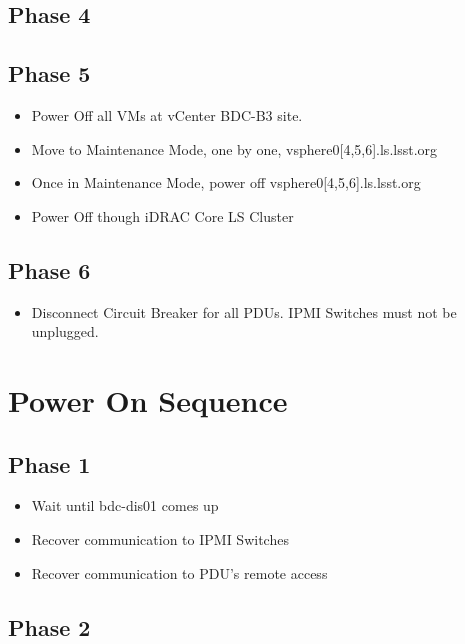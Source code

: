 \newpage
\subsection{Phase 4}

\newpage
\subsection{Phase 5}
\begin{itemize}
  \item Power Off all VMs at vCenter BDC-B3 site.
  \item Move to Maintenance Mode, one by one, vsphere0[4,5,6].ls.lsst.org
  \item Once in Maintenance Mode, power off vsphere0[4,5,6].ls.lsst.org
  \item Power Off though iDRAC Core LS Cluster
\end{itemize}

\newpage
\subsection{Phase 6}
\begin{itemize}
  \item Disconnect Circuit Breaker for all PDUs. IPMI Switches must not be unplugged.
\end{itemize}

\newpage
\section{Power On Sequence}
\subsection{Phase 1}
\begin{itemize}
  \item Wait until bdc-dis01 comes up
  \item Recover communication to IPMI Switches
  \item Recover communication to PDU's remote access  
\end{itemize}

\newpage
\subsection{Phase 2}

